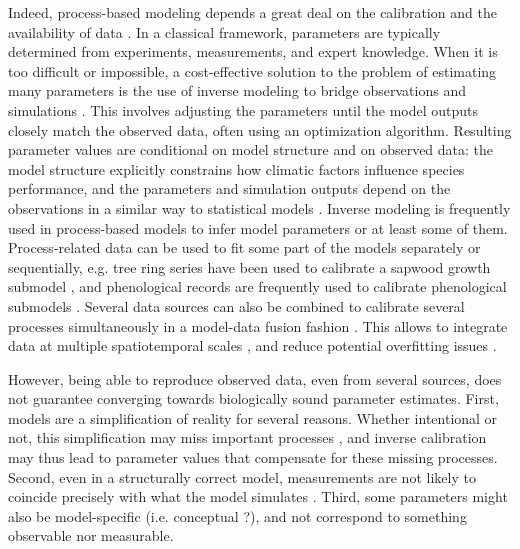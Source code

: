 \documentclass[letterpaper,8pt]{extarticle}  %
\begin{document}
\begin{doublespacing}
\begin{linenumbers}
Indeed, process-based modeling depends a great deal on the calibration and the availability of data \citep{Cabral2017}. In a classical framework, parameters are typically determined from experiments, measurements, and expert knowledge. When it is too difficult or impossible, a cost-effective solution to the problem of estimating many parameters is the use of inverse modeling to bridge observations and simulations \citep{Evans2016}. This involves adjusting the parameters until the model outputs closely match the observed data, often using an optimization algorithm. Resulting parameter values are conditional on model structure and on observed data: the model structure explicitly constrains how climatic factors influence species performance, and the parameters and simulation outputs depend on the observations in a similar way to statistical models \citep{Zhang2024}. Inverse modeling is frequently used in process-based models to infer model parameters or at least some of them. Process-related data can be used to fit some part of the models separately or sequentially, e.g. tree ring series have been used to calibrate a sapwood growth submodel \citep{DeCaceres2023}, and phenological records are frequently used to calibrate phenological submodels \citep{Chuine2013}. Several data sources can also be combined to calibrate several processes simultaneously in a model-data fusion fashion \citep[e.g.][]{Trotsiuk2020}. This allows to integrate data at multiple spatiotemporal scales \citep{Hartig2012, Niu2014}, and reduce potential overfitting issues \citep{Bacour2023}.

However, being able to reproduce observed data, even from several sources, does not guarantee converging towards biologically sound parameter estimates. First, models are a simplification of reality for several reasons. Whether intentional or not, this simplification may miss important processes \citep{Forrester2021}, and inverse calibration may thus lead to parameter values that compensate for these missing processes. Second, even in a structurally correct model, measurements are not likely to coincide precisely with what the model simulates \citep{Zhang2024}. Third, some parameters might also be model-specific (i.e. conceptual ?), and not correspond to something observable nor measurable.


\end{linenumbers}
\end{doublespacing}
\end{document}
